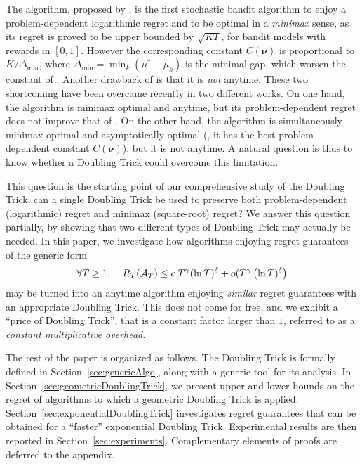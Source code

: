 \documentclass[12pt]{colt2018} %
\begin{document}
The \MOSS{} algorithm, proposed by \cite{Audibert2009minimax}, is the first stochastic bandit algorithm
to enjoy a problem-dependent logarithmic regret
and to be optimal in a \emph{minimax} sense, as its regret is proved to be upper bounded by $\sqrt{KT}$, for bandit models with rewards in $[0,1]$.
However the corresponding constant $C(\bm \nu)$ is proportional to $K/\Delta_{\min}$, where $\Delta_{\min} = \min_{k} (\mu^*-\mu_k)$ is the minimal gap, which worsen the constant of \UCBone{}.
Another drawback of \MOSS{} is that it is \emph{not} anytime.
%
These two shortcoming have been overcame recently in two different works.
On one hand, the \MOSSAnytime{} algorithm \citep{Degenne16} is minimax optimal and anytime, but its problem-dependent regret does not improve that of \MOSS.
On the other hand, the \KLUCBpp{} algorithm \citep{Menard17} is simultaneously minimax optimal and asymptotically optimal (\ie, it has the best problem-dependent constant $C(\bm\nu)$), but it is not anytime. A natural question is thus to know whether a Doubling Trick could overcome this limitation.


This question is the starting point of our comprehensive study of the Doubling Trick: can a single Doubling Trick be used to preserve both problem-dependent (logarithmic) regret and minimax (square-root) regret?
We answer this question partially, by showing that two different types of Doubling Trick may actually be needed.
In this paper, we investigate how algorithms enjoying regret guarantees of the generic form
\begin{equation}\label{eq:genericWithLogT}
    \forall T \geq 1,\;\;\;\; R_T(\mathcal{A}_T) \leq c \; T^{\gamma} (\ln T)^{\delta} + o( T^{\gamma} \left(\ln T)^{\delta} \right)
\end{equation}
may be turned into an anytime algorithm enjoying \emph{similar} regret guarantees with an appropriate Doubling Trick.
%
This does not come for free, and we exhibit a ``price of Doubling Trick'', that is a constant factor larger than $1$, referred to as a \emph{constant multiplicative overhead}.



The rest of the paper is organized as follows.
The Doubling Trick is formally defined in Section~\ref{sec:genericAlgo}, along with a generic tool for its analysis.
In Section~\ref{sec:geometricDoublingTrick}, we present upper and lower bounds on the regret of algorithms to which a geometric Doubling Trick is applied.
Section~\ref{sec:exponentialDoublingTrick} investigates regret guarantees that can be obtained for a ``faster'' exponential Doubling Trick.
Experimental results are then reported in Section~\ref{sec:experiments}.
Complementary elements of proofs are deferred to the appendix.
\end{document}
